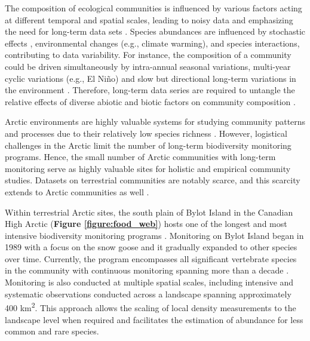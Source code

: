 \documentclass[a4paper,twoside,12pt]{article}
\begin{document}
The composition of ecological communities is influenced by various factors acting at different temporal and spatial scales, leading to noisy data and emphasizing the need for long-term data sets \citep{magurran2010, lindenmayer2012}. Species abundances are influenced by stochastic effects \citep{hubbell2001}, environmental changes (e.g., climate warming), and species interactions, contributing to data variability. For instance, the composition of a community could be driven simultaneously by intra-annual seasonal variations, multi-year cyclic variations (e.g., El Niño) and slow but directional long-term variations in the environment \citep{brown1990, snyder2006}. Therefore, long-term data series are required to untangle the relative effects of diverse abiotic and biotic factors on community composition \citep{magurran2010, lindenmayer2012}.

Arctic environments are highly valuable systems for studying community patterns and processes due to their relatively low species richness \citep{payer2013, legagneux2014}. However, logistical challenges in the Arctic limit the number of long-term biodiversity monitoring programs. Hence, the small number of Arctic communities with long-term monitoring serve as highly valuable sites for holistic and empirical community studies. Datasets on terrestrial communities are notably scarce, and this scarcity extends to Arctic communities as well \citep{ims2013}. 

Within terrestrial Arctic sites, the south plain of Bylot Island in the Canadian High Arctic (\textbf{Figure \ref{figure:food_web}}) hosts one of the longest and most intensive biodiversity monitoring programs \citep{gauthier2024a}. Monitoring on Bylot Island began in 1989 with a focus on the snow goose and it gradually expanded to other species over time. Currently, the program encompasses all significant vertebrate species in the community with continuous monitoring spanning more than a decade \citep{gauthier2024a}. Monitoring is also conducted at multiple spatial scales, including intensive and systematic observations conducted across a landscape spanning approximately 400 km\textsuperscript{2}. This approach allows the scaling of local density measurements to the landscape level when required and facilitates the estimation of abundance for less common and rare species. 
\end{document}
